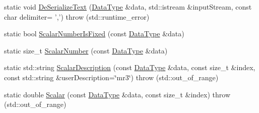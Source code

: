 \begin{DoxyCompactItemize}
\item 
static void \hyperlink{classcmn_data_3_01vct_frame4x4_3_01__element_type_00_01__row_major_01_4_01_4_af3259d2966be378b176aec926eaefe40}{De\-Serialize\-Text} (\hyperlink{classcmn_data_3_01vct_frame4x4_3_01__element_type_00_01__row_major_01_4_01_4_abf4e17a9d0af654027bedb454326d1d2}{Data\-Type} \&data, std\-::istream \&input\-Stream, const char delimiter= ',')  throw (std\-::runtime\-\_\-error)
\item 
static bool \hyperlink{classcmn_data_3_01vct_frame4x4_3_01__element_type_00_01__row_major_01_4_01_4_a9c177003d2bd17cd1ece088036486c1e}{Scalar\-Number\-Is\-Fixed} (const \hyperlink{classcmn_data_3_01vct_frame4x4_3_01__element_type_00_01__row_major_01_4_01_4_abf4e17a9d0af654027bedb454326d1d2}{Data\-Type} \&data)
\item 
static size\-\_\-t \hyperlink{classcmn_data_3_01vct_frame4x4_3_01__element_type_00_01__row_major_01_4_01_4_a3e2dc20550ce45808f60337787ef8fdd}{Scalar\-Number} (const \hyperlink{classcmn_data_3_01vct_frame4x4_3_01__element_type_00_01__row_major_01_4_01_4_abf4e17a9d0af654027bedb454326d1d2}{Data\-Type} \&data)
\item 
static std\-::string \hyperlink{classcmn_data_3_01vct_frame4x4_3_01__element_type_00_01__row_major_01_4_01_4_ac86068b388a163b68483ac65f2d4ba57}{Scalar\-Description} (const \hyperlink{classcmn_data_3_01vct_frame4x4_3_01__element_type_00_01__row_major_01_4_01_4_abf4e17a9d0af654027bedb454326d1d2}{Data\-Type} \&data, const size\-\_\-t \&index, const std\-::string \&user\-Description=\char`\"{}mr3\char`\"{})  throw (std\-::out\-\_\-of\-\_\-range)
\item 
static double \hyperlink{classcmn_data_3_01vct_frame4x4_3_01__element_type_00_01__row_major_01_4_01_4_a96b42e12017e054d4997c52afb363bf7}{Scalar} (const \hyperlink{classcmn_data_3_01vct_frame4x4_3_01__element_type_00_01__row_major_01_4_01_4_abf4e17a9d0af654027bedb454326d1d2}{Data\-Type} \&data, const size\-\_\-t \&index)  throw (std\-::out\-\_\-of\-\_\-range)
\end{DoxyCompactItemize}


